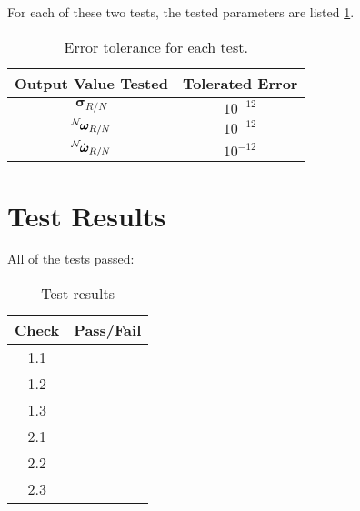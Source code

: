 For each of these two tests, the tested parameters are listed \ref{tab:errortol}. 
\begin{table}[htbp]
	\caption{Error tolerance for each test.}
	\label{tab:errortol}
	\centering \fontsize{10}{10}\selectfont
	\begin{tabular}{ c | c } %
		\hline\hline
		\textbf{Output Value Tested}  & \textbf{Tolerated Error}  \\ 
		\hline
		$\bm\sigma_{R/N}$     		        	     &  $10^{-12}	$   \\ 
		$\leftexp{N}{\bm\omega_{R/N}}$            &  $10^{-12}  $ \\ 
		$\leftexp{N}{\dot{\bm \omega}_{R/N}}$   & $10^{-12}  $\\ 
		\hline\hline
	\end{tabular}
\end{table}




\section{Test Results}

All of the tests passed:
\begin{table}[H]
	\caption{Test results}
	\label{tab:results}
	\centering \fontsize{10}{10}\selectfont
	\begin{tabular}{c | c  } %
		\hline\hline
		\textbf{Check} 						  		&\textbf{Pass/Fail} \\ 
		\hline
	   1.1	   			&  \\ 
	   1.2	   			&  \\ 
	   1.3	   			&  \\ 
	   2.1	   			&  \\ 
	   2.2	   			&  \\ 
	   2.3	   			&  \\ 
	   \hline\hline
	\end{tabular}
\end{table}




